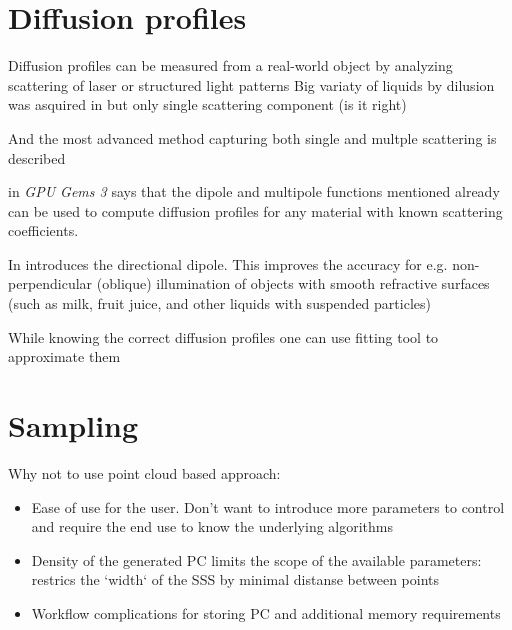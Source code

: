 \section{Diffusion profiles}
\begin{itemize}
    \item{Diffusion profiles can be measured from a real-world object by
    analyzing scattering of laser \cite{Jensen:2001:PMS:383259.383319} or
    structured light patterns \cite{tariq_efficient_2006-1} Big variaty of
    liquids by dilusion was asquired in
    \cite{Narasimhan:2006:ASP:1141911.1141986} but only single scattering
    component (is it right)
    \item{And the most advanced method capturing both single and multple
    scattering is described \cite{Gkioulekas:2013:IVR:2508363.2508377}}}
    \item{\cite{Nguyen:2007:GG:1407436} in \textit{GPU Gems 3} says that the
    dipole and multipole functions mentioned already can be used to compute
    diffusion profiles for any material with known scattering coefficients.
    \item{In \cite{Frisvad:2014:DDM:2702692.2682629} introduces the directional
    dipole}. This improves the accuracy for e.g. non-perpendicular (oblique)
    illumination of objects with smooth refractive surfaces (such as milk, fruit
    juice, and other liquids with suspended particles) }
    \item{While knowing the correct diffusion profiles one can use fitting tool
    to approximate them \cite{Nguyen:2007:GG:1407436}}
\end{itemize}

\section{Sampling}
Why not to use point cloud based approach:
\begin{itemize}
  \item Ease of use for the user. Don't want to introduce more parameters to
  control and require the end use to know the underlying algorithms
  \item{Density of the generated PC limits the scope of the available
  parameters: restrics the `width` of the SSS by minimal distanse between
  points}
  \item{Workflow complications for storing PC and additional memory
  requirements}
\end{itemize}

